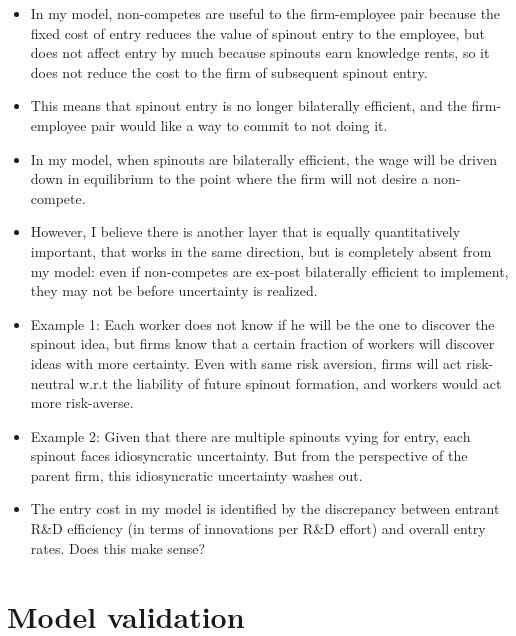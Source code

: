 \documentclass[11pt,english]{article}
\theoremstyle{remark}
\begin{document}
\begin{itemize}
	\item In my model, non-competes are useful to the firm-employee pair because the fixed cost of entry reduces the value of spinout entry to the employee, but does not affect entry by much because spinouts earn knowledge rents, so it does not reduce the cost to the firm of subsequent spinout entry.
	\item This means that spinout entry is no longer bilaterally efficient, and the firm-employee pair would like a way to commit to not doing it.
	\item In my model, when spinouts are bilaterally efficient, the wage will be driven down in equilibrium to the point where the firm will not desire a non-compete.
	\item However, I believe there is another layer that is equally quantitatively important, that works in the same direction, but is completely absent from my model: even if non-competes are ex-post bilaterally efficient to implement, they may not be before uncertainty is realized.
	\item Example 1: Each worker does not know if he will be the one to discover the spinout idea, but firms know that a certain fraction of workers will discover ideas with more certainty. Even with same risk aversion, firms will act risk-neutral w.r.t the liability of future spinout formation, and workers would act more risk-averse.
	\item Example 2: Given that there are multiple spinouts vying for entry, each spinout faces idiosyncratic uncertainty. But from the perspective of the parent firm, this idiosyncratic uncertainty washes out. 
	\item The entry cost in my model is identified by the discrepancy between entrant R\&D efficiency (in terms of innovations per R\&D effort) and overall entry rates. Does this make sense?
\end{itemize}


\section*{Model validation}
\end{document}
